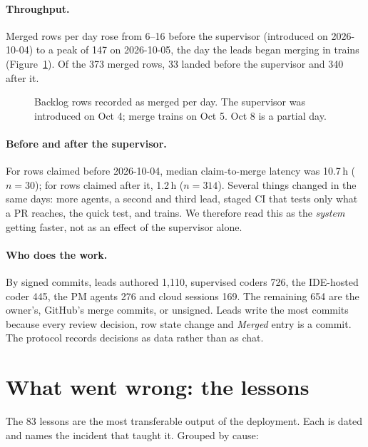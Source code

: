 \documentclass[11pt]{article}
\begin{document}
\paragraph{Throughput.} Merged rows per day rose from 6--16 before the
supervisor (introduced on 2026-10-04) to a peak of 147 on 2026-10-05, the day
the leads began merging in trains (Figure~\ref{fig:throughput}). Of the 373
merged rows, 33 landed before the supervisor and 340 after it.

\begin{figure}[h]
\centering
{}
\caption{Backlog rows recorded as merged per day. The supervisor was introduced on Oct 4; merge trains on Oct 5. Oct 8 is a partial day.}
\label{fig:throughput}
\end{figure}

\paragraph{Before and after the supervisor.} For rows claimed before
2026-10-04, median claim-to-merge latency was 10.7\,h ($n{=}30$); for rows
claimed after it, 1.2\,h ($n{=}314$). Several things changed in the same days:
more agents, a second and third lead, staged CI that tests only what a PR
reaches, the quick test, and trains. We therefore read this as the
\emph{system} getting faster, not as an effect of the supervisor alone.

\paragraph{Who does the work.} By signed commits, leads authored 1{,}110,
supervised coders 726, the IDE-hosted coder 445, the PM agents 276 and cloud
sessions 169. The remaining 654 are the owner's, GitHub's merge commits, or
unsigned. Leads write the most commits because every review decision, row
state change and \emph{Merged} entry is a commit. The protocol records
decisions as data rather than as chat.

\section{What went wrong: the lessons}\label{sec:lessons}
The 83 lessons are the most transferable output of the deployment. Each is
dated and names the incident that taught it. Grouped by cause:
\end{document}
